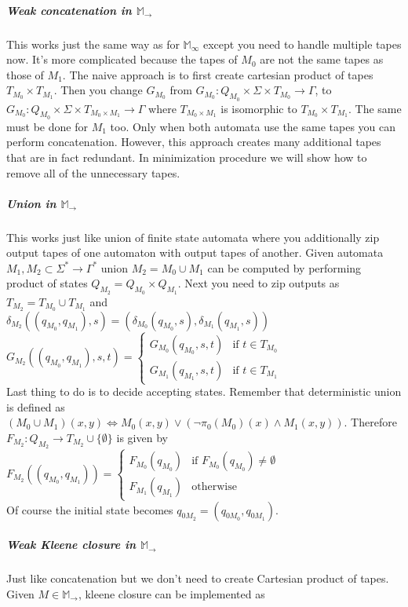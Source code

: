\documentclass[12pt]{article}
\begin{document}
\subparagraph{Weak concatenation in $\mathbb{M}_\rightarrow$} This works just the same way as for $\mathbb{M}_\infty$ except you need to handle multiple tapes now. It's more complicated because the tapes of $M_0$ are not the same tapes as those of $M_1$. The naive approach is to first create cartesian product of tapes $T_{M_0} \times T_{M_1}$. Then you change $G_{M_0}$ from $G_{M_0} : Q_{M_0} \times \Sigma \times T_{M_0} \rightarrow \Gamma$, to $G_{M_0} : Q_{M_0} \times \Sigma \times T_{M_0 \times M_1} \rightarrow \Gamma$ where $T_{M_0 \times M_1}$ is isomorphic to $T_{M_0} \times T_{M_1}$. The same must be done for $M_1$ too. Only when both automata use the same tapes you can perform concatenation. However, this approach creates many additional tapes that are in fact redundant. In minimization procedure we  will show how to remove all of the unnecessary tapes.

\subparagraph{Union in $\mathbb{M}_\rightarrow$}  This works just like union of finite state automata where you additionally zip output tapes of one automaton with output tapes of another. Given automata $M_1,M_2 \subset \Sigma^* \rightarrow \Gamma^*$ union $M_2=M_0 \cup M_1$ can be computed by performing product of states $Q_{M_2} = Q_{M_0} \times Q_{M_1}$. Next you need to zip outputs as $T_{M_2} = T_{M_0} \cup T_{M_1}$  and \\
$\delta_{M_2}((q_{M_0},q_{M_1}),s) = 
(\delta_{M_0}(q_{M_0},s),\delta_{M_1}(q_{M_1},s))$ \\
$G_{M_2}((q_{M_0},q_{M_1}),s,t) = \begin{cases}
G_{M_0}(q_{M_0},s,t)  & \mbox{if }  t \in T_{M_0} \\
G_{M_1}(q_{M_1},s,t)  & \mbox{if }  t \in T_{M_1}
\end{cases}$\\
Last thing to do is to decide accepting states. Remember that deterministic union is defined as $(M_0 \cup M_1)(x,y) \iff M_0(x,y) \vee (\neg \pi_0(M_0)(x) \wedge M_1(x,y))$. Therefore $F_{M_2} : Q_{M_2}  \rightarrow T_{M_2} \cup \{\emptyset\}$ is given by \\
$F_{M_2}((q_{M_0},q_{M_1})) = \begin{cases}
F_{M_0}(q_{M_0})  & \mbox{if }  F_{M_0}(q_{M_0}) \ne \emptyset  \\
F_{M_1}(q_{M_1})  & \mbox{otherwise} 
\end{cases} $ \\
Of course the initial state becomes $q_{0M_2}=(q_{0M_0},q_{0M_1})$.

\subparagraph{Weak Kleene closure in $\mathbb{M}_\rightarrow$} Just like concatenation but we don't need to create Cartesian product of tapes. Given $M \in \mathbb{M}_\rightarrow$, kleene closure can be implemented as
\end{document}
